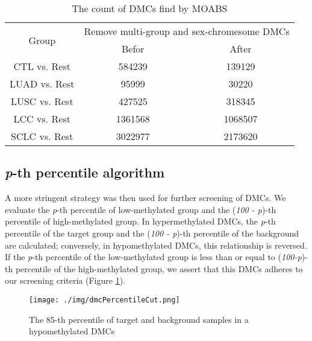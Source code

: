 \documentclass[10pt]{article}
\begin{document}
\begin{table}[htbp]
    \begin{center}
        \caption{The count of DMCs find by MOABS}
        \begin{tabular}{|c|c|c|}
            \hline
            \multirow{2}{*}{Group} & \multicolumn{2}{c|}{Remove multi-group and sex-chromesome DMCs}           \\
            \cline{2-3}            & Befor                                     & After   \\
            \hline
            CTL vs. Rest           & 584239                                    & 139129   \\
            LUAD vs. Rest          & 95999                                     & 30220    \\
            LUSC vs. Rest          & 427525                                    & 318345    \\
            LCC vs. Rest           & 1361568                                   & 1068507    \\
            SCLC vs. Rest          & 3022977                                   & 2173620 \\
            \hline
        \end{tabular}
    \end{center}
    \label{tab:table_dmc_ount}
\end{table}

\subsection{\textit{p}-th percentile algorithm}

A more stringent strategy was then used for further screening of DMCs. We evaluate the 
\textit{p}-th percentile of low-methylated group and the (\textit{100 - p})-th percentile
of high-methylated group. In hypermethylated DMCs, the \textit{p}-th percentile of the target
group and the (\textit{100 - p})-th percentile of the background are calculated; conversely,
in hypomethylated DMCs, this relationship is reversed. If the \textit{p}-th percentile of the
low-methylated group is less than or equal to (\textit{100-p})-th percentile of the high-methylated
group, we assert that this DMCs adheres to our screening criteria (Figure \ref*{fig:dmcPC}).

\begin{figure}[htbp]
    \centering
    \texttt{[image: ./img/dmcPercentileCut.png]}
    \caption{The 85-th percentile of target and background samples in a hypomethylated DMCs}
    \label{fig:dmcPC}
\end{figure}
\end{document}

